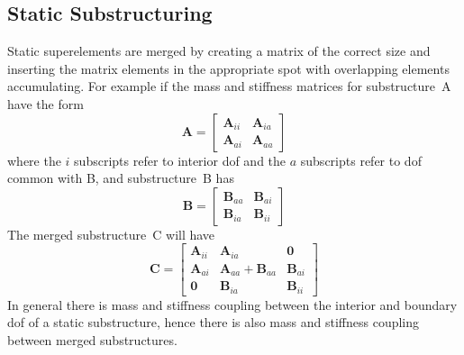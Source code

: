 \documentclass[11pt,openany,twoside]{book}
\numberwithin{equation}{section}		%
\newcommand{\Matrix}[1]{\boldsymbol{#1}}
\newcommand{\Ss}{substructure}
\newcommand{\Sss}{substructures}
\begin{document}
\subsection{\label{sect:static-ss}Static Substructuring}
\par
Static superelements are merged by creating a matrix of the correct size
and inserting the matrix elements in the appropriate spot with
overlapping elements accumulating.
For example if the mass and stiffness matrices for \Ss\ A have the form
\begin{equation}
\Matrix{A} = \left[
\begin{array}{cc}
   \Matrix{A}_{ii} & \Matrix{A}_{ia} \\
   \Matrix{A}_{ai} & \Matrix{A}_{aa}
\end{array}
\right]	\nonumber
\end{equation}
where the $i$ subscripts refer to interior dof and the $a$
subscripts refer to dof common with B, and \Ss\ B has
\begin{equation}
\Matrix{B} = \left[
\begin{array}{cc}
   \Matrix{B}_{aa} & \Matrix{B}_{ai} \\
   \Matrix{B}_{ia} & \Matrix{B}_{ii}
\end{array}
\right]	\nonumber
\end{equation}
The merged \Ss\ C will have
\begin{equation}\label{eqn:merged-ss}
\Matrix{C} = \left[
\begin{array}{ccc}
   \Matrix{A}_{ii} & \Matrix{A}_{ia} & \Matrix{0} \\
   \Matrix{A}_{ai} & \Matrix{A}_{aa} + \Matrix{B}_{aa} & \Matrix{B}_{ai} \\
   \Matrix{0} & \Matrix{B}_{ia} & \Matrix{B}_{ii}
\end{array}
\right]
\end{equation}
In general there is mass and stiffness coupling between the
interior and boundary dof of a static \Ss, hence
there is also mass and stiffness coupling between
merged \Sss.
\end{document}
